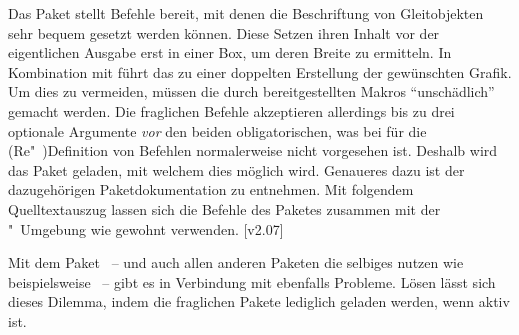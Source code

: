 %
Das Paket  stellt Befehle bereit, mit denen die Beschriftung 
von Gleitobjekten sehr bequem gesetzt werden können. Diese Setzen ihren Inhalt 
vor der eigentlichen Ausgabe erst in einer Box, um deren Breite zu ermitteln. 
In Kombination mit  führt das zu einer doppelten 
Erstellung der gewünschten Grafik. Um dies zu vermeiden, müssen die durch 
 bereitgestellten Makros \enquote{unschädlich} gemacht 
werden. Die fraglichen Befehle akzeptieren allerdings bis zu drei optionale 
Argumente \emph{vor} den beiden obligatorischen, was bei  für die 
(Re"~)Definition von Befehlen normalerweise nicht vorgesehen ist. Deshalb wird 
das Paket  geladen, mit welchem dies möglich wird. Genaueres 
dazu ist der dazugehörigen Paketdokumentation zu entnehmen. Mit folgendem 
Quelltextauszug lassen sich die Befehle des Paketes  zusammen 
mit der "~Umgebung wie gewohnt verwenden.
[v2.07]
%
\begin{quoting}
\begin{Code}
\usepackage{floatrow}
\usepackage{xparse}
\ifpdf\else
\fi
\end{Code}
\end{quoting}

%
Mit dem Paket ~-- und auch allen anderen Paketen die 
selbiges nutzen wie beispielsweise ~-- gibt es in Verbindung 
mit  ebenfalls Probleme. Lösen lässt sich dieses Dilemma, 
indem die fraglichen Pakete lediglich geladen werden, wenn  
aktiv ist.
%
\begin{quoting}[rightmargin=0pt]
\begin{Code}
\ifpdf
  \usepackage{tikz}%
\fi
\end{Code}
\end{quoting}



